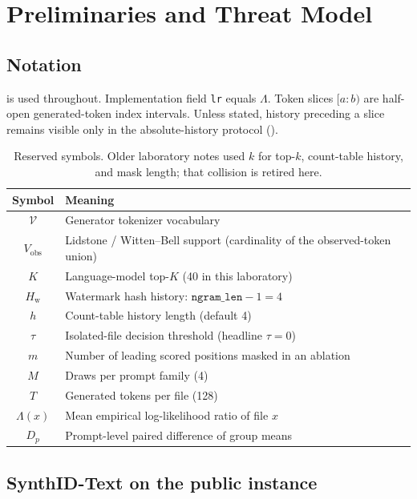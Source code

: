 \documentclass[11pt,a4paper]{article}
\theoremstyle{definition}
\newcommand{\V}{\mathcal{V}}
\newcommand{\LLR}{\Lambda}
\newcommand{\Hw}{H_{\mathrm{w}}}
\newcommand{\Ktop}{K}
\newcommand{\hist}{h}
\begin{document}
\section{Preliminaries and Threat Model}
\label{sec:prelim}

\subsection{Notation}

 is used throughout. Implementation field \texttt{lr}
equals $\LLR$. Token slices $[a{:}b)$ are half-open generated-token
index intervals. Unless stated, history preceding a slice remains
visible only in the absolute-history protocol
().

\begin{table}[t]
\centering
\small
\caption{Reserved symbols. Older laboratory notes used $k$ for top-$k$,
count-table history, and mask length; that collision is retired here.}
\label{tab:notation}
\begin{tabular}{cl}
\toprule
Symbol & Meaning \\
\midrule
$\V$ & Generator tokenizer vocabulary \\
$V_{\mathrm{obs}}$ & Lidstone / Witten--Bell support (cardinality of the observed-token union) \\
$\Ktop$ & Language-model top-$\Ktop$ (40 in this laboratory) \\
$\Hw$ & Watermark hash history: $\mathtt{ngram\_len}-1=4$ \\
$\hist$ & Count-table history length (default 4) \\
$\tau$ & Isolated-file decision threshold (headline $\tau=0$) \\
$m$ & Number of leading scored positions masked in an ablation \\
$M$ & Draws per prompt family (4) \\
$T$ & Generated tokens per file (128) \\
$\LLR(x)$ & Mean empirical log-likelihood ratio of file $x$ \\
$D_p$ & Prompt-level paired difference of group means \\
\bottomrule
\end{tabular}
\end{table}

\subsection{SynthID-Text on the public instance}
\end{document}
